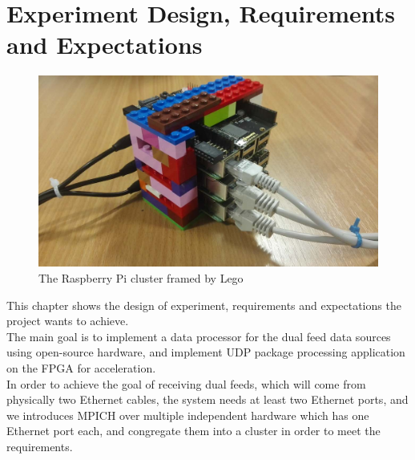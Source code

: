 \documentclass[11pt,openright,a4paper]{report}
\begin{document}
\chapter{Experiment Design, Requirements and Expectations}
\begin{figure}[H]
	\centering
	\includegraphics[width=0.7\linewidth]{picture/photo/cluster}
	\caption{The Raspberry Pi cluster framed by Lego}
	\label{fig:cluster}
\end{figure}
This chapter shows the design of experiment, requirements and expectations the project wants to achieve. \\
The main goal is to implement a data processor for the dual feed data sources using open-source hardware, and implement UDP package processing application on the FPGA for acceleration.\\
In order to achieve the goal of receiving dual feeds, which will come from physically two Ethernet cables, the system needs at least two Ethernet ports, and we introduces MPICH over multiple independent hardware which has one Ethernet port each, and congregate them into a cluster in order to meet the requirements.\\
\newpage
\end{document}

